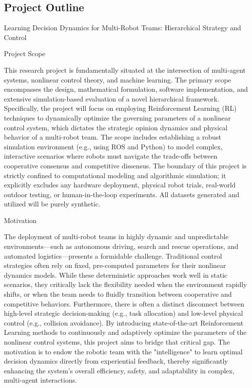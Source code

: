\clearpage
\printbibliography[title={References},heading=bibintoc]


\begin{uomappendix}

\section{Project Outline}

Learning Decision Dynamics for Multi-Robot Teams: Hierarchical Strategy and Control

Project Scope

This research project is fundamentally situated at the intersection of multi-agent systems, nonlinear control theory, and machine learning. The primary scope encompasses the design, mathematical formulation, software implementation, and extensive simulation-based evaluation of a novel hierarchical framework. Specifically, the project will focus on employing Reinforcement Learning (RL) techniques to dynamically optimize the governing parameters of a nonlinear control system, which dictates the strategic opinion dynamics and physical behavior of a multi-robot team. The scope includes establishing a robust simulation environment (e.g., using ROS and Python) to model complex, interactive scenarios where robots must navigate the trade-offs between cooperative consensus and competitive dissensus. The boundary of this project is strictly confined to computational modeling and algorithmic simulation; it explicitly excludes any hardware deployment, physical robot trials, real-world outdoor testing, or human-in-the-loop experiments. All datasets generated and utilized will be purely synthetic.

Motivation

The deployment of multi-robot teams in highly dynamic and unpredictable environments---such as autonomous driving, search and rescue operations, and automated logistics---presents a formidable challenge. Traditional control strategies often rely on fixed, pre-computed parameters for their nonlinear dynamics models. While these deterministic approaches work well in static scenarios, they critically lack the flexibility needed when the environment rapidly shifts, or when the team needs to fluidly transition between cooperative and competitive behaviors. Furthermore, there is often a distinct disconnect between high-level strategic decision-making (e.g., task allocation) and low-level physical control (e.g., collision avoidance). By introducing state-of-the-art Reinforcement Learning methods to continuously and adaptively optimize the parameters of the nonlinear control systems, this project aims to bridge that critical gap. The motivation is to endow the robotic team with the "intelligence" to learn optimal decision dynamics directly from experiential feedback, thereby significantly enhancing the system's overall efficiency, safety, and adaptability in complex, multi-agent interactions.


\end{uomappendix}

